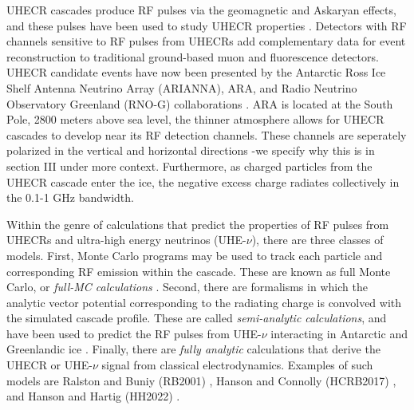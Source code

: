 \documentclass[amsmath,amssymb,aps,prd,10pt,twocolumn,showkeys]{revtex4}
\begin{document}
UHECR cascades produce RF pulses via the geomagnetic and Askaryan effects, and these pulses have been used to study UHECR properties \cite{huege2017radiowave-6f6,schroder2025radio-14a}.  Detectors with RF channels sensitive to RF pulses from UHECRs add complementary data for event reconstruction to traditional ground-based muon and fluorescence detectors.  UHECR candidate events have now been presented by the Antarctic Ross Ice Shelf Antenna Neutrino Array (ARIANNA), ARA, and Radio Neutrino Observatory Greenland (RNO-G) collaborations \cite{barwick2017radio-c4a,xwqy-yzrk,agarwal2025validating-d6c}.  ARA is located at the South Pole, 2800 meters above sea level, the thinner atmosphere allows for UHECR cascades to develop near its RF detection channels. These channels are seperately polarized in the vertical and horizontal directions -we specify why this is in section III under more context. Furthermore, as charged particles from the UHECR cascade enter the ice, the negative excess charge radiates collectively in the 0.1-1 GHz bandwidth.

Within the genre of calculations that predict the properties of RF pulses from UHECRs and ultra-high energy neutrinos (UHE-$\nu$), there are three classes of models.  First, Monte Carlo programs may be used to track each particle and corresponding RF emission within the cascade.  These are known as full Monte Carlo, or \textit{full-MC calculations} \cite{zas1992electromagnetic-a30,10.1016/j.astropartphys.2009.06.005,alameddine2025simulating-06f}.  Second, there are formalisms in which the analytic vector potential corresponding to the radiating charge is convolved with the simulated cascade profile.  These are called \textit{semi-analytic calculations}, and have been used to predict the RF pulses from UHE-$\nu$ interacting in Antarctic and Greenlandic ice \cite{10.1103/physrevd.84.103003,PhysRevD.101.083005,10.1140/epjc/s10052-020-7612-8}.  Finally, there are \textit{fully analytic} calculations that derive the UHECR or UHE-$\nu$ signal from classical electrodynamics.  Examples of such models are Ralston and Buniy (RB2001) \cite{10.1103/physrevd.65.016003}, Hanson and Connolly (HCRB2017) \cite{10.1016/j.astropartphys.2017.03.008}, and Hanson and Hartig (HH2022) \cite{PhysRevD.105.123019}.
\end{document}

